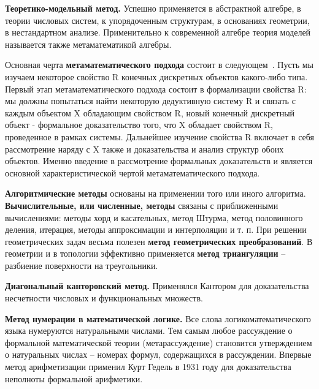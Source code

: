 \textbf{Теоретико-модельный метод.} Успешно применяется в абстрактной алгебре, в теории числовых систем, к упорядоченным структурам, в основаниях геометрии, в нестандартном анализе. Применительно к современной алгебре теория моделей называется также метаматематикой алгебры. 

Основная черта \textbf{метаматематического подхода} состоит в следующем~\cite{матиясевич1975метаматематическом}. Пусть мы изучаем некоторое свойство R конечных дискретных объектов какого-либо типа. Первый этап метаматематического подхода состоит в формализации свойства R: мы должны попытаться найти некоторую дедуктивную систему R и связать с каждым объектом X обладающим свойством R, новый конечный дискретный объект - формальное доказательство того, что X обладает свойством R, проведенное в рамках системы. Дальнейшее изучение свойства R включает в себя рассмотрение наряду с X также и доказательства и анализ структур обоих объектов. Именно введение в рассмотрение формальных доказательств и является основной характеристической чертой метаматематического подхода. 

\textbf{Алгоритмические методы} основаны на применении того или иного алгоритма. \textbf{Вычислительные, или численные, методы} связаны с приближенными вычислениями: методы хорд и касательных, метод Штурма, метод половинного деления, итерация, методы аппроксимации и интерполяции и т. п. При решении геометрических задач весьма полезен \textbf{метод геометрических преобразований}. В геометрии и в топологии эффективно применяется \textbf{метод триангуляции} – разбиение поверхности на треугольники.

\textbf{Диагональный канторовский метод.} Применялся Кантором для доказательства несчетности числовых и функциональных множеств.

\textbf{Метод нумерации в математической логике.} Все слова логикоматематического языка нумеруются натуральными числами. Тем самым любое рассуждение о формальной математической теории (метарассуждение) становится утверждением о натуральных числах – номерах формул, содержащихся в рассуждении. Впервые метод арифметизации применил Курт Гедель в 1931 году для доказательства неполноты формальной арифметики.




